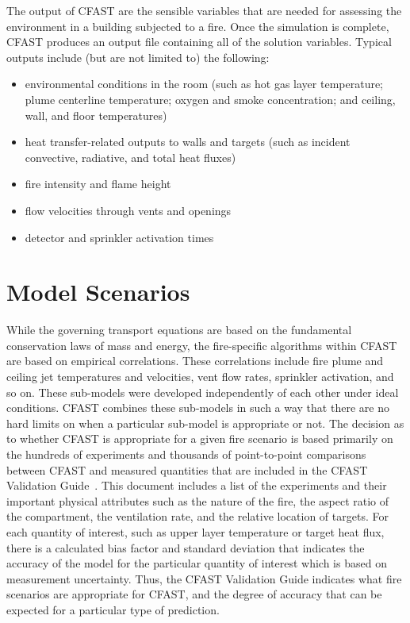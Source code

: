 \documentclass[12pt,twoside]{book}
\begin{document}
The output of CFAST are the sensible variables that are needed for assessing the environment in a building subjected to a fire. Once the simulation is complete, CFAST produces an output file containing all of the solution variables.  Typical outputs include (but are not limited to) the following:
\begin{itemize}
\item environmental conditions in the room (such as hot gas layer temperature; plume centerline temperature; oxygen and smoke concentration; and ceiling, wall, and floor temperatures)
\item heat transfer-related outputs to walls and targets (such as incident convective, radiative, and total heat fluxes)
\item fire intensity and flame height
\item flow velocities through vents and openings
\item detector and sprinkler activation times
\end{itemize}


\section{Model Scenarios}

While the governing transport equations are based on the fundamental conservation laws of mass and energy, the fire-specific algorithms within CFAST are based on empirical correlations. These correlations include fire plume and ceiling jet temperatures and velocities, vent flow rates, sprinkler activation, and so on. These sub-models were developed independently of each other under ideal conditions. CFAST combines these sub-models in such a way that there are no hard limits on when a particular sub-model is appropriate or not. The decision as to whether CFAST is appropriate for a given fire scenario is based primarily on the hundreds of experiments and thousands of point-to-point comparisons between CFAST and measured quantities that are included in the CFAST Validation Guide~\cite{CFAST_Valid_Guide_7}. This document includes a list of the experiments and their important physical attributes such as the nature of the fire, the aspect ratio of the compartment, the ventilation rate, and the relative location of targets. For each quantity of interest, such as upper layer temperature or target heat flux, there is a calculated bias factor and standard deviation that indicates the accuracy of the model for the particular quantity of interest which is based on measurement uncertainty. Thus, the CFAST Validation Guide indicates what fire scenarios are appropriate for CFAST, and the degree of accuracy that can be expected for a particular type of prediction.
\end{document}
